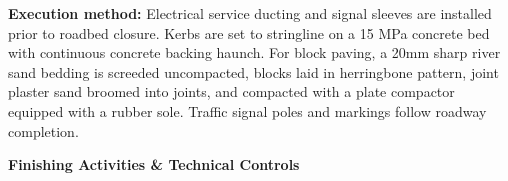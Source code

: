 \noindent
\begin{minipage}[t]{0.185\textwidth}\end{minipage}\hfill
\begin{minipage}[t]{0.185\textwidth}\end{minipage}\hfill
\begin{minipage}[t]{0.185\textwidth}\end{minipage}\hfill
\begin{minipage}[t]{0.185\textwidth}\end{minipage}\hfill
\begin{minipage}[t]{0.185\textwidth}\end{minipage}

\vspace{0.20cm}

\noindent
\begin{tcolorbox}[enhanced, colback=mhoffwhite, colframe=mhlightgray, boxrule=0.7pt, arc=4pt, left=9pt, right=9pt, top=7pt, bottom=7pt, borderline west={3pt}{0pt}{mhgold}, drop shadow=black!4]
    {\fontsize{8.1pt}{11.0pt}\selectfont\color{mhtext}
    \textbf{Execution method:} Electrical service ducting and signal sleeves are installed prior to roadbed closure. Kerbs are set to stringline on a 15 MPa concrete bed with continuous concrete backing haunch. For block paving, a 20mm sharp river sand bedding is screeded uncompacted, blocks laid in herringbone pattern, joint plaster sand broomed into joints, and compacted with a plate compactor equipped with a rubber sole. Traffic signal poles and markings follow roadway completion.
    }
\end{tcolorbox}

\vfill

\noindent
{\large\bfseries\color{mhnavy} Finishing Activities \& Technical Controls}
\vspace{0.10cm}


